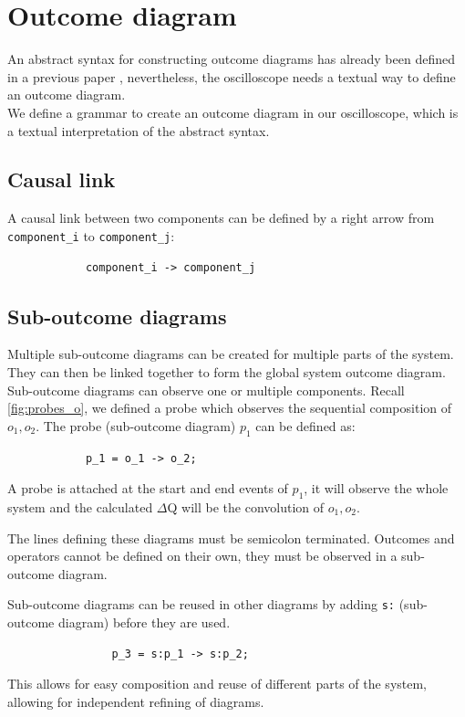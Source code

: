   \section{Outcome diagram}
        An abstract syntax for constructing outcome diagrams has already been defined in a previous paper \cite{art}, nevertheless, the oscilloscope needs a textual way to define an outcome diagram. \\ 
        We define  a grammar to create an outcome diagram in our oscilloscope, which is a textual interpretation of the abstract syntax.
        
      
        \subsection{Causal link}
            A causal link between two components can be defined by a right arrow from \texttt{component\_i} to \texttt{component\_j}:
        \begin{verbatim}
            component_i -> component_j 
        \end{verbatim}
        
        \subsection{Sub-outcome diagrams}
            Multiple sub-outcome diagrams can be created for multiple parts of the system. They can then be linked together to form the global system outcome diagram. Sub-outcome diagrams can observe one or multiple components.
        Recall \cref{fig:probes_o}, we defined a probe which observes the sequential composition of $o_1, o_2$. The probe (sub-outcome diagram) $p_1$ can be defined as:
        \begin{verbatim}
            p_1 = o_1 -> o_2;
        \end{verbatim}

        A probe is attached at the start and end events of $p_1$, it will observe the whole system and the calculated $\Delta$Q will be the convolution of $o_1, o_2$.

        The lines defining these diagrams must be semicolon terminated. Outcomes and operators cannot be defined on their own, they must be observed in a sub-outcome diagram.
        
        Sub-outcome diagrams can be reused in other diagrams by adding \texttt{s:} (sub-outcome diagram) before they are used.

            \begin{verbatim}
                p_3 = s:p_1 -> s:p_2;
            \end{verbatim}
            This allows for easy composition and reuse of different parts of the system, allowing for independent refining of diagrams.

